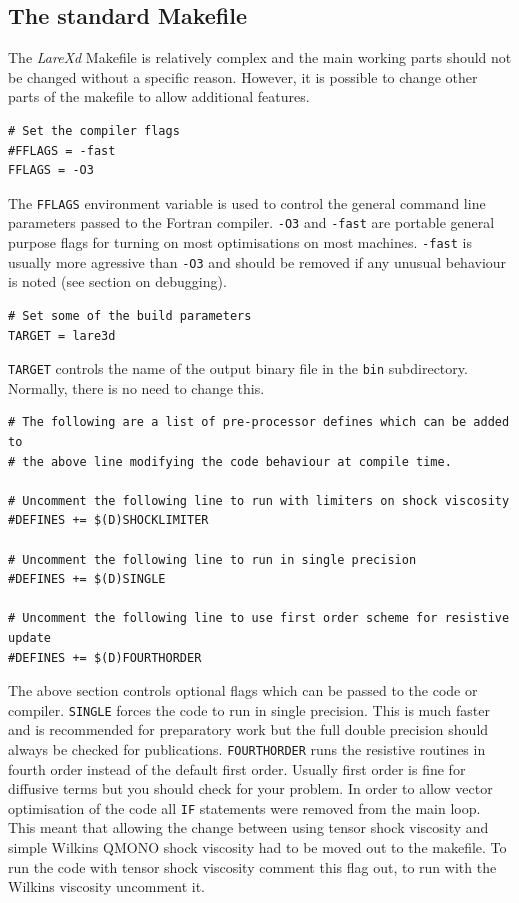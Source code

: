 \documentclass[11pt]{article}
\begin{document}
\subsection{The standard Makefile}
The {\it LareXd} Makefile is relatively complex and the main working parts should not be changed without a specific reason. 
However, it is possible to change other parts of the makefile to allow additional features.\\
\begin{verbatim}
# Set the compiler flags
#FFLAGS = -fast
FFLAGS = -O3
\end{verbatim}
The \texttt{FFLAGS} environment variable is used to control the general command line parameters passed to the Fortran compiler. 
\texttt{-O3} and \texttt{-fast} are portable general purpose flags for turning on most optimisations on most machines. 
\texttt{-fast} is usually more agressive than \texttt{-O3} and should be removed if any unusual behaviour is noted (see section on debugging).
\begin{verbatim}
# Set some of the build parameters
TARGET = lare3d
\end{verbatim}
\texttt{TARGET} controls the name of the output binary
file in the \texttt{bin} subdirectory. Normally, there is no need to change this.
\begin{verbatim}
# The following are a list of pre-processor defines which can be added to
# the above line modifying the code behaviour at compile time.

# Uncomment the following line to run with limiters on shock viscosity
#DEFINES += $(D)SHOCKLIMITER

# Uncomment the following line to run in single precision
#DEFINES += $(D)SINGLE

# Uncomment the following line to use first order scheme for resistive update
#DEFINES += $(D)FOURTHORDER
\end{verbatim}
The above section controls optional flags which can be passed to the code or compiler. \texttt{SINGLE} forces the code 
to run in single precision. This is much faster and is recommended for preparatory work but the full double precision 
should always be checked for publications. \texttt{FOURTHORDER} runs the resistive routines in fourth order instead of 
the default first order. Usually first order is fine for diffusive terms but you should
check for your problem.
In order to allow vector optimisation of the code all \texttt{IF} statements were removed from the main loop. This 
meant that allowing the change between using tensor shock viscosity and simple Wilkins QMONO shock viscosity had to 
be moved out to the makefile. To run the code with tensor shock viscosity comment this flag out, to run with the Wilkins 
viscosity uncomment it.
\end{document}
